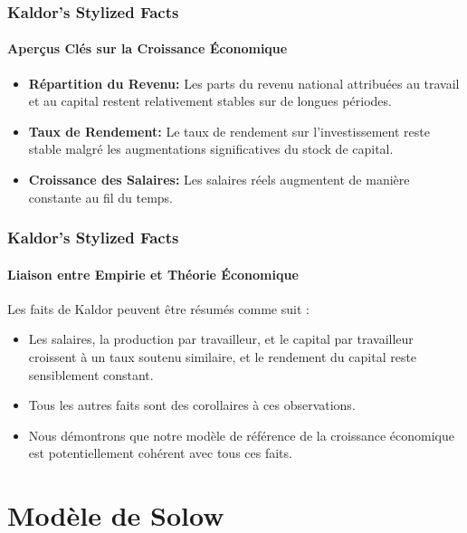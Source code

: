 \documentclass{beamer}
\begin{document}
\begin{frame}
    \frametitle{Kaldor's Stylized Facts}
    \hypertarget{kaldor}{} %
    \framesubtitle{Aperçus Clés sur la Croissance Économique}
        \begin{itemize}
            \item \textbf{Répartition du Revenu:} 
            Les parts du revenu national attribuées au travail et au capital 
            restent relativement stables sur de longues périodes.
            \hyperlink{income}{}
            \item \textbf{Taux de Rendement:} Le taux de rendement sur l'investissement reste stable malgré les augmentations significatives du stock de capital.
            \hyperlink{return}{}
            \item \textbf{Croissance des Salaires:} 
            Les salaires réels augmentent de manière constante au fil du temps.
            \hyperlink{wages}{}
        \end{itemize}
\end{frame}
\begin{frame}
    \frametitle{Kaldor's Stylized Facts}
    \framesubtitle{Liaison entre Empirie et Théorie Économique}
    \hypertarget{kaldor_summary}{} %
    Les faits de Kaldor peuvent être résumés comme suit :
    \begin{itemize}
        \item  Les salaires, la production par travailleur, et le capital par travailleur 
        croissent à un taux soutenu similaire, et le rendement du capital reste sensiblement constant.
        \pause
        \item Tous les autres faits sont des corollaires à ces observations.
        \pause
        \item Nous démontrons que notre modèle de référence de la croissance économique
        est potentiellement cohérent avec tous ces faits.
    \end{itemize}
\end{frame}
\section{Modèle de Solow}
\end{document}
